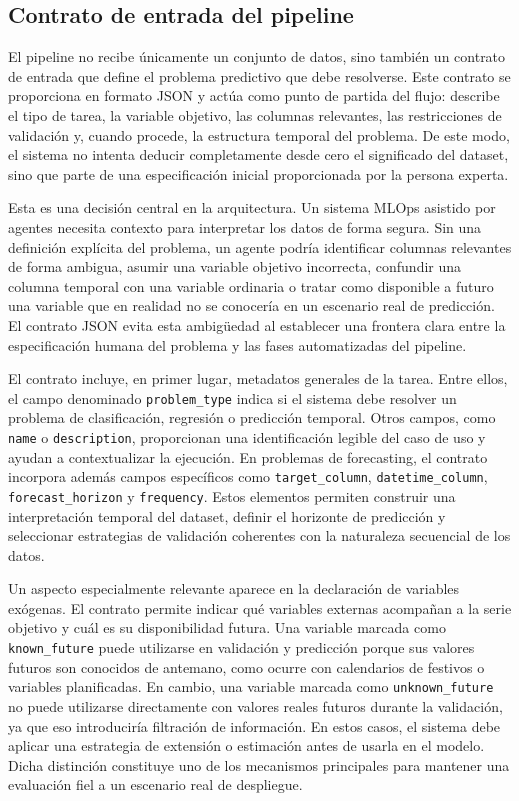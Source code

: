 \documentclass[12pt,a4paper]{article}
\theoremstyle{plain}
\begin{document}
\subsection{Contrato de entrada del pipeline}
\label{sec:contrato-entrada-pipeline}

El pipeline no recibe únicamente un conjunto de datos, sino también un contrato de entrada que define el problema predictivo que debe resolverse. Este contrato se proporciona en formato JSON y actúa como punto de partida del flujo: describe el tipo de tarea, la variable objetivo, las columnas relevantes, las restricciones de validación y, cuando procede, la estructura temporal del problema. De este modo, el sistema no intenta deducir completamente desde cero el significado del dataset, sino que parte de una especificación inicial proporcionada por la persona experta.

Esta es una decisión central en la arquitectura. Un sistema MLOps asistido por agentes necesita contexto para interpretar los datos de forma segura. Sin una definición explícita del problema, un agente podría identificar columnas relevantes de forma ambigua, asumir una variable objetivo incorrecta, confundir una columna temporal con una variable ordinaria o tratar como disponible a futuro una variable que en realidad no se conocería en un escenario real de predicción. El contrato JSON evita esta ambigüedad al establecer una frontera clara entre la especificación humana del problema y las fases automatizadas del pipeline.

El contrato incluye, en primer lugar, metadatos generales de la tarea. Entre ellos, el campo denominado \texttt{problem\_type} indica si el sistema debe resolver un problema de clasificación, regresión o predicción temporal. Otros campos, como \texttt{name} o \texttt{description}, proporcionan una identificación legible del caso de uso y ayudan a contextualizar la ejecución. En problemas de forecasting, el contrato incorpora además campos específicos como \texttt{target\_column}, \texttt{datetime\_column}, \texttt{forecast\_horizon} y \texttt{frequency}. Estos elementos permiten construir una interpretación temporal del dataset, definir el horizonte de predicción y seleccionar estrategias de validación coherentes con la naturaleza secuencial de los datos.

Un aspecto especialmente relevante aparece en la declaración de variables exógenas. El contrato permite indicar qué variables externas acompañan a la serie objetivo y cuál es su disponibilidad futura. Una variable marcada como \texttt{known\_future} puede utilizarse en validación y predicción porque sus valores futuros son conocidos de antemano, como ocurre con calendarios de festivos o variables planificadas. En cambio, una variable marcada como \texttt{unknown\_future} no puede utilizarse directamente con valores reales futuros durante la validación, ya que eso introduciría filtración de información. En estos casos, el sistema debe aplicar una estrategia de extensión o estimación antes de usarla en el modelo. Dicha distinción constituye uno de los mecanismos principales para mantener una evaluación fiel a un escenario real de despliegue.
\end{document}

